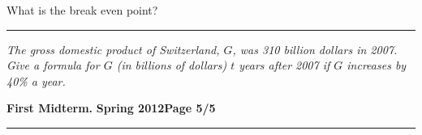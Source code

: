 \documentclass[12pt]{article}
\begin{document}
\begin{flushright}
\end{flushright}
\noindent
What is the break even point?
\vspace{3cm}

\begin{flushright}
\end{flushright}
\hrule
{\problem[10 pts] \em The gross domestic product of Switzerland, $G$,
  was 310 billion dollars in 2007.  Give a formula for $G$ (in
  billions of dollars) $t$ years after 2007 if $G$ increases by 40\% a
  year.}
\vspace{4cm}
\begin{flushright}
\end{flushright}
\newpage

\hfill{\large\bf First Midterm.}\hfill{\large\bf
  Spring 2012}\hfill{\large\bf Page 5/5}\hrule
\end{document}
